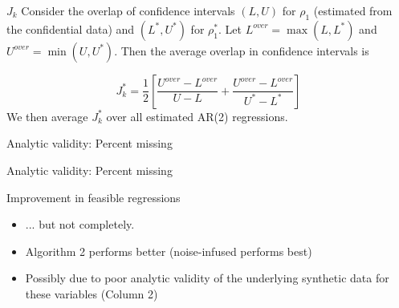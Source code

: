 \begin{frame}{$J_k$}
Consider the overlap of confidence intervals $(L,U)$ for $\rho_1$ (estimated from the 
confidential data) and $(L^{*},U^{*})$ for $\rho_1^*$. Let $L^{over} = \max (L,L^{*} )$ and 
$U^{over} = \min (U,U^{*})$. Then the average overlap in confidence intervals is

$$
J_k^{*} = \frac{1}{2} \left [ \frac{U^{over} - L^{over}}{U-L} + \frac{U^{over} - L^{over}}{U^*-L ^*}        \right ]
$$
We then average $J_k^{*}$ over all estimated AR(2) regressions.
\end{frame}

%
%
%


\begin{frame}[fragile]{Analytic validity: Percent missing}
	\begin{center}
\tiny
		
		
		
	\end{center}
\end{frame}

\begin{frame}[fragile]{Analytic validity: Percent missing}
\begin{block}{Improvement in feasible regressions}
\begin{itemize}
	\item 	... but not completely. 
	\item Algorithm 2 performs better (noise-infused performs best)
	\item Possibly due to poor analytic validity of the underlying synthetic data for these variables (Column 2)
\end{itemize}	
\end{block}
\end{frame}




%		
%		
%		
%

